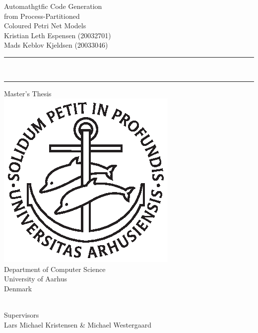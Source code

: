 \documentclass[twoside,11pt,openright]{report} %
\newcommand{\clearemptydoublepage}{\newpage{\pagestyle{empty}\cleardoublepage}}
\begin{document}
\thispagestyle{empty} 
\vspace*{\fill}
\begin{flushright}
  {\Huge\sf Automathgtfic Code Generation}\\[2ex]
  {\Huge\sf from Process-Partitioned}\\[2ex]
  {\Huge\sf Coloured Petri Net Models}\\[4ex]
  {\huge\sf Kristian Leth Espensen (20032701)\\Mads Keblov Kjeldsen (20033046)} 
\end{flushright}
\noindent\rule{\linewidth}{1mm}\\[-.5ex]
\noindent\rule{\linewidth}{2.5mm}
\vfill
\begin{center}
  {\huge\sf Master's Thesis}\\[\fill]
  \includegraphics{au-segl.ps}\\[\fill]
  {\sf Department of Computer Science\\University of Aarhus\\Denmark}
\end{center}
\begin{center}
  {\sf \makeatletter\@date\makeatother\\Supervisors\\Lars Michael Kristensen \& Michael Westergaard}
\end{center}
\vspace*{\fill}
\clearemptydoublepage



\end{document}
